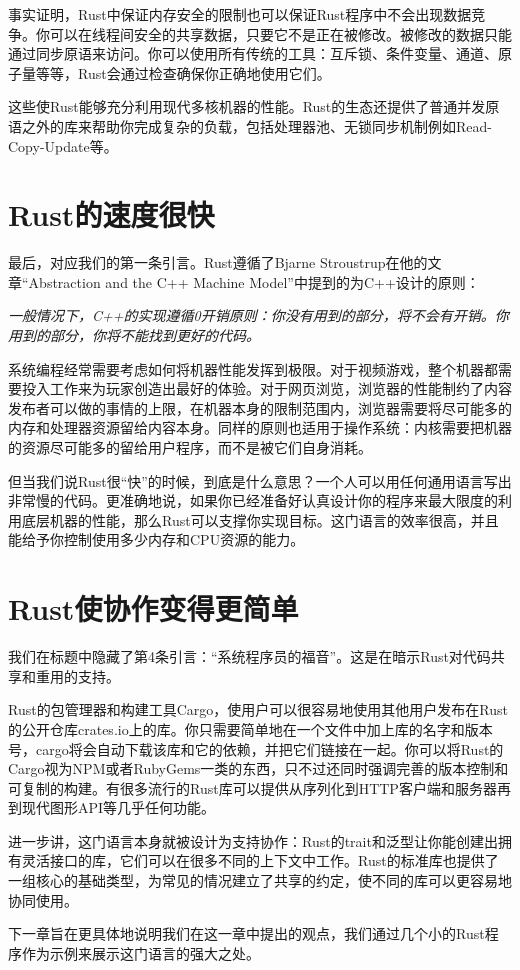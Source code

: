 事实证明，Rust中保证内存安全的限制也可以保证Rust程序中不会出现数据竞争。你可以在线程间安全的共享数据，只要它不是正在被修改。被修改的数据只能通过同步原语来访问。你可以使用所有传统的工具：互斥锁、条件变量、通道、原子量等等，Rust会通过检查确保你正确地使用它们。

这些使Rust能够充分利用现代多核机器的性能。Rust的生态还提供了普通并发原语之外的库来帮助你完成复杂的负载，包括处理器池、无锁同步机制例如Read-Copy-Update等。

\section{Rust的速度很快}
最后，对应我们的第一条引言。Rust遵循了Bjarne Stroustrup在他的文章“Abstraction and the C++ Machine Model”中提到的为C++设计的原则：

\emph{一般情况下，C++的实现遵循0开销原则：你没有用到的部分，将不会有开销。你用到的部分，你将不能找到更好的代码。}

系统编程经常需要考虑如何将机器性能发挥到极限。对于视频游戏，整个机器都需要投入工作来为玩家创造出最好的体验。对于网页浏览，浏览器的性能制约了内容发布者可以做的事情的上限，在机器本身的限制范围内，浏览器需要将尽可能多的内存和处理器资源留给内容本身。同样的原则也适用于操作系统：内核需要把机器的资源尽可能多的留给用户程序，而不是被它们自身消耗。

但当我们说Rust很“快”的时候，到底是什么意思？一个人可以用任何通用语言写出非常慢的代码。更准确地说，如果你已经准备好认真设计你的程序来最大限度的利用底层机器的性能，那么Rust可以支撑你实现目标。这门语言的效率很高，并且能给予你控制使用多少内存和CPU资源的能力。

\section{Rust使协作变得更简单}
我们在标题中隐藏了第4条引言：“系统程序员的福音”。这是在暗示Rust对代码共享和重用的支持。

Rust的包管理器和构建工具Cargo，使用户可以很容易地使用其他用户发布在Rust的公开仓库crates.io上的库。你只需要简单地在一个文件中加上库的名字和版本号，cargo将会自动下载该库和它的依赖，并把它们链接在一起。你可以将Rust的Cargo视为NPM或者RubyGems一类的东西，只不过还同时强调完善的版本控制和可复制的构建。有很多流行的Rust库可以提供从序列化到HTTP客户端和服务器再到现代图形API等几乎任何功能。

进一步讲，这门语言本身就被设计为支持协作：Rust的trait和泛型让你能创建出拥有灵活接口的库，它们可以在很多不同的上下文中工作。Rust的标准库也提供了一组核心的基础类型，为常见的情况建立了共享的约定，使不同的库可以更容易地协同使用。

下一章旨在更具体地说明我们在这一章中提出的观点，我们通过几个小的Rust程序作为示例来展示这门语言的强大之处。
